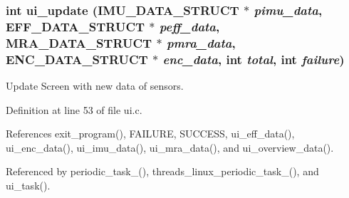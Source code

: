 \hypertarget{group__ui_ga42e4dac2d138061a74c572358c8ebf49}{
\subsubsection[{ui\_\-update}]{\setlength{\rightskip}{0pt plus 5cm}int ui\_\-update ({\bf IMU\_\-DATA\_\-STRUCT} $\ast$ {\em pimu\_\-data}, \/  {\bf EFF\_\-DATA\_\-STRUCT} $\ast$ {\em peff\_\-data}, \/  {\bf MRA\_\-DATA\_\-STRUCT} $\ast$ {\em pmra\_\-data}, \/  {\bf ENC\_\-DATA\_\-STRUCT} $\ast$ {\em enc\_\-data}, \/  int {\em total}, \/  int {\em failure})}}
\label{group__ui_ga42e4dac2d138061a74c572358c8ebf49}


Update Screen with new data of sensors. 



Definition at line 53 of file ui.c.



References exit\_\-program(), FAILURE, SUCCESS, ui\_\-eff\_\-data(), ui\_\-enc\_\-data(), ui\_\-imu\_\-data(), ui\_\-mra\_\-data(), and ui\_\-overview\_\-data().



Referenced by periodic\_\-task\_(), threads\_\-linux\_\-periodic\_\-task\_(), and ui\_\-task().





